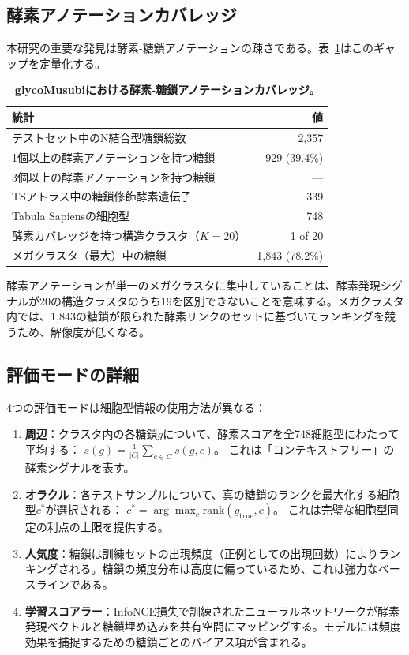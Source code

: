 \documentclass[11pt,a4paper]{ltjsarticle}
\begin{document}
\subsection{酵素アノテーションカバレッジ}

本研究の重要な発見は酵素-糖鎖アノテーションの疎さである。表~\ref{tab:enzyme_coverage}はこのギャップを定量化する。

\begin{table}[H]
\centering
\caption{\textbf{glycoMusubiにおける酵素-糖鎖アノテーションカバレッジ。}}
\label{tab:enzyme_coverage}
\small
\begin{tabular}{lr}
\toprule
\textbf{統計} & \textbf{値} \\
\midrule
テストセット中のN結合型糖鎖総数      & 2,357 \\
1個以上の酵素アノテーションを持つ糖鎖  & 929 (39.4\%) \\
3個以上の酵素アノテーションを持つ糖鎖 & --- \\
TSアトラス中の糖鎖修飾酵素遺伝子  & 339 \\
Tabula Sapiensの細胞型            & 748 \\
\midrule
酵素カバレッジを持つ構造クラスタ（$K = 20$） & 1 of 20 \\
メガクラスタ（最大）中の糖鎖       & 1,843 (78.2\%) \\
\bottomrule
\end{tabular}
\end{table}

酵素アノテーションが単一のメガクラスタに集中していることは、酵素発現シグナルが20の構造クラスタのうち19を区別できないことを意味する。メガクラスタ内では、1,843の糖鎖が限られた酵素リンクのセットに基づいてランキングを競うため、解像度が低くなる。

\subsection{評価モードの詳細}

4つの評価モードは細胞型情報の使用方法が異なる：

\begin{enumerate}
\item \textbf{周辺}：クラスタ内の各糖鎖$g$について、酵素スコアを全748細胞型にわたって平均する：
$\bar{s}(g) = \frac{1}{|C|} \sum_{c \in C} s(g, c)$。
これは「コンテキストフリー」の酵素シグナルを表す。

\item \textbf{オラクル}：各テストサンプルについて、真の糖鎖のランクを最大化する細胞型$c^*$が選択される：
$c^* = \arg\max_c \text{rank}(g_{\text{true}}, c)$。
これは完璧な細胞型同定の利点の上限を提供する。

\item \textbf{人気度}：糖鎖は訓練セットの出現頻度（正例としての出現回数）によりランキングされる。糖鎖の頻度分布は高度に偏っているため、これは強力なベースラインである。

\item \textbf{学習スコアラー}：InfoNCE損失で訓練されたニューラルネットワークが酵素発現ベクトルと糖鎖埋め込みを共有空間にマッピングする。モデルには頻度効果を捕捉するための糖鎖ごとのバイアス項が含まれる。
\end{enumerate}
\end{document}
